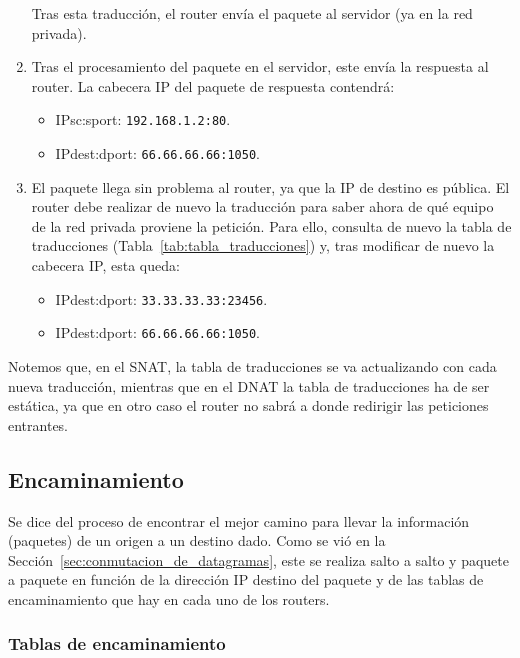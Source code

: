 \begin{ejemplo}
\begin{enumerate}[label=(\arabic*)]
        Tras esta traducción, el router envía el paquete al servidor (ya en la red privada).
        
        \item Tras el procesamiento del paquete en el servidor, este envía la respuesta al router. La cabecera IP del paquete de respuesta contendrá:
            \begin{itemize}
                \item {IPsc}:{sport}: \verb|192.168.1.2:80|.
                \item {IPdest}:{dport}: \verb|66.66.66.66:1050|.
            \end{itemize}
        
        \item El paquete llega sin problema al router, ya que la IP de destino es pública. El router debe realizar de nuevo la traducción para saber ahora de qué equipo de la red privada proviene la petición. Para ello, consulta de nuevo la tabla de traducciones (Tabla~\ref{tab:tabla_traducciones}) y, tras modificar de nuevo la cabecera IP, esta queda:
            \begin{itemize}
                \item {IPdest}:{dport}: \verb|33.33.33.33:23456|.
                \item {IPdest}:{dport}: \verb|66.66.66.66:1050|.
            \end{itemize}
    \end{enumerate}

    Notemos que, en el \acrshort{SNAT}, la tabla de traducciones se va actualizando con cada nueva traducción, mientras que en el \acrshort{DNAT} la tabla de traducciones ha de ser estática, ya que en otro caso el router no sabrá a donde redirigir las peticiones entrantes.
\end{ejemplo}

\subsection{Encaminamiento}
Se dice del proceso de encontrar el mejor camino para llevar la información (paquetes) de un origen a un destino dado. Como se vió en la Sección~\ref{sec:conmutacion_de_datagramas}, este se realiza salto a salto y paquete a paquete en función de la dirección IP destino del paquete y de las tablas de encaminamiento que hay en cada uno de los routers.

\subsubsection{Tablas de encaminamiento}

